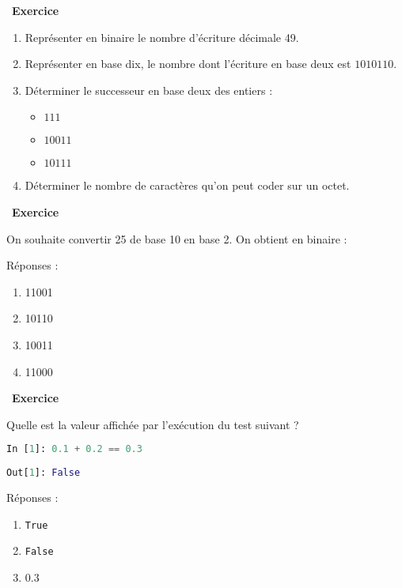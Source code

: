 \documentclass[
  11pt,
]{article}
\newcommand{\passthrough}[1]{#1}
\providecommand{\tightlist}{%
  \setlength{\itemsep}{0pt}\setlength{\parskip}{0pt}}
\newcounter{exo}
\newenvironment{exercice}[1]
{\par \medskip   \addtocounter{exo}{1} \noindent  
\begin{bclogo}[arrondi =0.1,   noborder = true, logo=\bccrayon, marge=4]{~\textbf{Exercice} \textbf{\theexo} {\itshape #1} }  \par}
{
\end{bclogo}
 \par \bigskip }
\newcounter{def}
\begin{document}
\begin{exercice}{}

\begin{enumerate}
\def\labelenumi{\arabic{enumi}.}
\tightlist
\item
  Représenter en binaire le nombre d'écriture décimale 49.
\item
  Représenter en base dix, le nombre dont l'écriture en base deux est
  \(1010110\).
\item
  Déterminer le successeur en base deux des entiers :

  \begin{itemize}
  \tightlist
  \item
    \(111\)
  \item
    \(10011\)
  \item
    \(10111\)
  \end{itemize}
\item
  Déterminer le nombre de caractères qu'on peut coder sur un octet.
\end{enumerate}

\end{exercice}

\begin{exercice}{}

On souhaite convertir 25 de base 10 en base 2. On obtient en binaire :

Réponses :

\begin{enumerate}
\def\labelenumi{\arabic{enumi}.}
\tightlist
\item
  11001
\item
  10110
\item
  10011
\item
  11000
\end{enumerate}

\end{exercice}

\begin{exercice}{}

Quelle est la valeur affichée par l'exécution du test suivant ?

\begin{lstlisting}[language=Python]
In [1]: 0.1 + 0.2 == 0.3              
                                                                                                                                                                         
Out[1]: False
\end{lstlisting}

Réponses :

\begin{enumerate}
\def\labelenumi{\arabic{enumi}.}
\tightlist
\item
  \passthrough{\lstinline!True!}
\item
  \passthrough{\lstinline!False!}
\item
  0.3
\end{enumerate}

\end{exercice}
\end{document}
